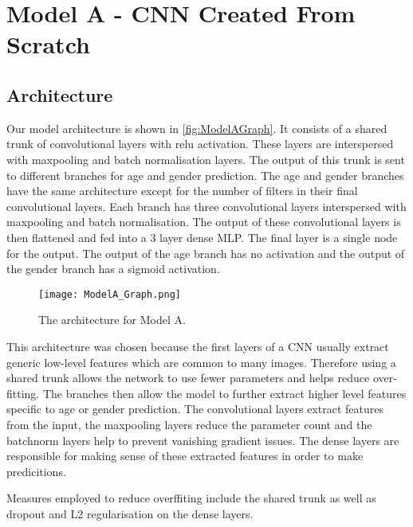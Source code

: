 
\section{Model A - CNN Created From Scratch}
\subsection{Architecture}
Our model architecture is shown in \autoref{fig:ModelAGraph}. 
It consists of a shared trunk of convolutional layers with relu activation. These layers are interspersed with maxpooling and batch normalisation layers.  
The output of this trunk is sent to different branches for age and gender prediction. 
The age and gender branches have the same architecture except for the number of filters in their final convolutional layers. 
Each branch has three convolutional layers interspersed with maxpooling and batch normalisation. 
The output of these convolutional layers is then flattened and fed into a 3 layer dense MLP. The final layer is a single node for the output. The output of the age branch has no activation and the output of the gender branch has a sigmoid activation. 

\begin{figure}[h!]
    \centering
    \texttt{[image: ModelA\_Graph.png]}
    \caption{\label{fig:ModelAGraph} The architecture for Model A.}
\end{figure}

This architecture was chosen because the first layers of a CNN usually extract generic low-level features which are common to many images. 
Therefore using a shared trunk allows the network to use fewer parameters and helps reduce over-fitting.
The branches then allow the model to further extract higher level features specific to age or gender prediction. 
The convolutional layers extract features from the input, the maxpooling layers reduce the parameter count and the batchnorm layers help to prevent vanishing gradient issues. The dense layers are responsible for making sense of these extracted features in order to make predicitions.

Measures employed to reduce overffiting include the shared trunk as well as dropout and L2 regularisation on the dense layers.

